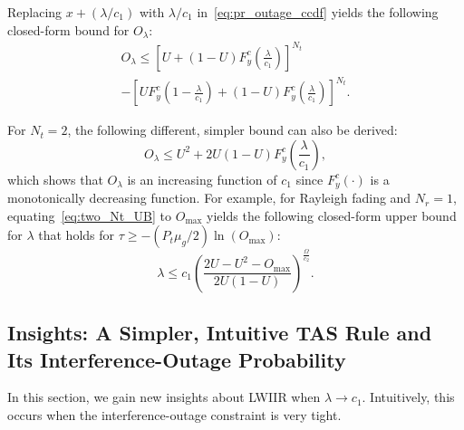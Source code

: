\documentclass[journal]{IEEEtran}
\newcommand{\tendsto}{\to}
\newcommand{\lam}{\lambda}
\newcommand{\mug}{{\mu_{g}}}
\newcommand{\Nt}{{N_t}}
\newcommand{\Nr}{{N_r}}
\newcommand{\Pt}{{P_t}}
\newcommand{\outmax}{O_{\text{max}}}
\newcommand{\itau}{\tau}
\newcommand{\cone}{c_{1}}
\newcommand{\ctwo}{c_{2}}
\newcommand{\out}{O}
\newcommand{\lambycone}{\frac{\lam}{\cone}}
\newcommand{\lambyconeinl}{\lam/\cone}
\newcommand{\al}{\ctwo}
\newcommand{\snr}{\Omega}
\newcommand{\snrbyal}[1][]{\frac{\snr#1}{\al}}
\newcommand{\un}{U}
\newcommand{\outlam}{\out_{\lam}}
\begin{document}
Replacing $x+\left( \lambyconeinl\right) $ with $\lambyconeinl$ in~\eqref{eq:pr_outage_ccdf} yields the following closed-form bound for $\outlam$: 
%
\begin{multline}
\label{eq:pr_outage_ub}
\outlam  \leq \left[ \un + \left(1-\un\right)F_{y}^{c}\left(\lambycone\right)  \right]^{\Nt} \\ -  \left[ \un F_{y}^{c}\left(1-\lambycone\right) + \left(1-\un\right)F_{y}^{c}\left(\lambycone\right)  \right]^{\Nt}.
\end{multline}



%
For $\Nt = 2$, the following different, simpler bound can also be derived: 
%
\begin{equation}
\label{eq:two_Nt_UB}
\outlam \leq \un^2 + 2\un(1-\un)F_{y}^{c}\left(\lambycone\right),
\end{equation}
which shows that $\outlam$ is an increasing function of $\cone$ since $F_{y}^{c}(\cdot)$ is a monotonically decreasing function. For example, for Rayleigh fading and $\Nr=1$, equating~\eqref{eq:two_Nt_UB} to $\outmax$ yields the following closed-form upper bound for $\lam$ that holds for $\itau\geq-\left( \Pt\mug/{2}\right) \ln\left({\outmax}\right)$:
%
\begin{equation}
\label{eq:two_Nt_lam}
\lam \leq \cone \left( \frac{2\un - \un^2 - \outmax}{2\un(1-\un)} \right)^{\snrbyal[]}.
\end{equation} 




\subsection{Insights: A Simpler, Intuitive  TAS Rule and Its Interference-Outage Probability}\label{sec:insights}

In this section, we gain new insights about LWIIR when $\lam \tendsto \cone$. Intuitively, this occurs when the interference-outage constraint is very tight.
\end{document}
